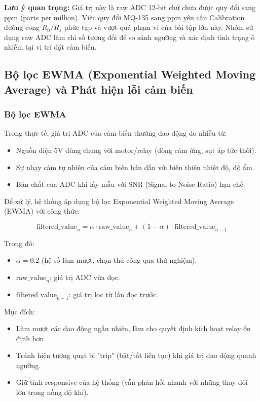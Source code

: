 \documentclass[../BTL_PTIT.tex]{subfiles}
\begin{document}
\textbf{Lưu ý quan trọng:} Giá trị này là raw ADC 12-bit chứ chưa được quy đổi sang ppm (parts per million). Việc quy đổi MQ-135 sang ppm yêu cầu Calibration đường cong $R_0/R_s$ phức tạp và vượt quá phạm vi của bài tập lớn này. Nhóm sử dụng raw ADC làm chỉ số tương đối để so sánh ngưỡng và xác định tình trạng ô nhiễm tại vị trí đặt cảm biến.

\subsection{Bộ lọc EWMA (Exponential Weighted Moving Average) và Phát hiện lỗi cảm biến}

\subsubsection{Bộ lọc EWMA}
Trong thực tế, giá trị ADC của cảm biến thường dao động do nhiễu từ:
\begin{itemize}[label=\textbullet]
    \item Nguồn điện 5V dùng chung với motor/relay (dòng cảm ứng, sụt áp tức thời).
    \item Sự nhạy cảm tự nhiên của cảm biến bán dẫn với biến thiên nhiệt độ, độ ẩm.
    \item Bản chất của ADC khi lấy mẫu với SNR (Signal-to-Noise Ratio) hạn chế.
\end{itemize}

Để xử lý, hệ thống áp dụng bộ lọc Exponential Weighted Moving Average (EWMA) với công thức:

$$\text{filtered\_value}_n = \alpha \cdot \text{raw\_value}_n + (1 - \alpha) \cdot \text{filtered\_value}_{n-1}$$

Trong đó:
\begin{itemize}[label=\textbullet]
    \item $\alpha = 0.2$ (hệ số làm mượt, chọn thủ công qua thử nghiệm).
    \item $\text{raw\_value}_n$: giá trị ADC vừa đọc.
    \item $\text{filtered\_value}_{n-1}$: giá trị lọc từ lần đọc trước.
\end{itemize}

Mục đích:
\begin{itemize}[label=\textbullet]
    \item Làm mượt các dao động ngẫu nhiên, làm cho quyết định kích hoạt relay ổn định hơn.
    \item Tránh hiện tượng quạt bị "trip" (bật/tắt liên tục) khi giá trị dao động quanh ngưỡng.
    \item Giữ tính responsive của hệ thống (vẫn phản hồi nhanh với những thay đổi lớn trong nồng độ khí).
\end{itemize}
\end{document}
